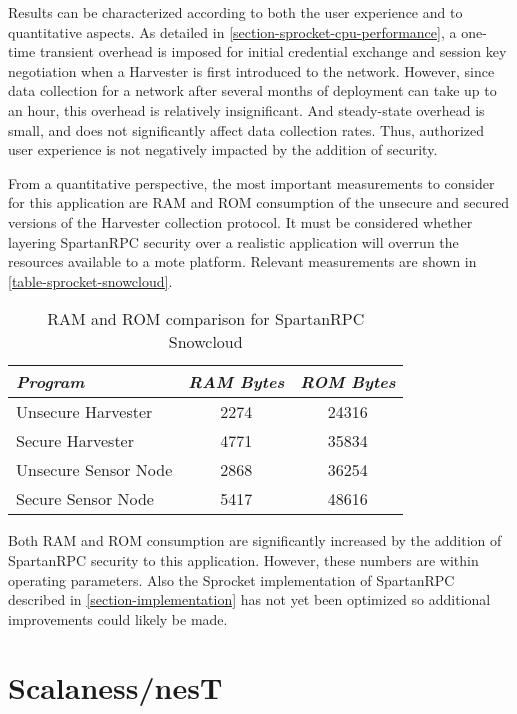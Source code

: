Results can be characterized according to both the user experience and to quantitative aspects.
As detailed in \autoref{section-sprocket-cpu-performance}, a one-time transient overhead is
imposed for initial credential exchange and session key negotiation when a Harvester is first
introduced to the network. However, since data collection for a network after several months of
deployment can take up to an hour, this overhead is relatively insignificant. And steady-state
overhead is small, and does not significantly affect data collection rates. Thus, authorized
user experience is not negatively impacted by the addition of security.

From a quantitative perspective, the most important measurements to consider for this
application are RAM and ROM consumption of the unsecure and secured versions of the Harvester
collection protocol. It must be considered whether layering SpartanRPC security over a realistic
application will overrun the resources available to a mote platform. Relevant measurements are
shown in \autoref{table-sprocket-snowcloud}.

\begin{table}[h]
\centering \newcommand\T{\rule{0pt}{2.1ex}}
\caption{RAM and ROM comparison for SpartanRPC Snowcloud} {
\begin{tabular}{|l|c|c|}
\hline
\emph{Program} \T       & \emph{RAM Bytes} & \emph{ROM Bytes} \\ \hline\hline
Unsecure Harvester \T   &             2274 &            24316 \\ \hline
Secure Harvester \T     &             4771 &            35834 \\ \hline
Unsecure Sensor Node \T &             2868 &            36254 \\ \hline
Secure Sensor Node \T   &             5417 &            48616 \\ \hline
\end{tabular}
}
\label{table-sprocket-snowcloud}
\end{table}

Both RAM and ROM consumption are significantly increased by the addition of SpartanRPC security
to this application. However, these numbers are within operating parameters. Also the Sprocket
implementation of SpartanRPC described in \autoref{section-implementation} has not yet been
optimized so additional improvements could likely be made.

\section{Scalaness/nesT}
\label{section-scalaness-evaluation}

